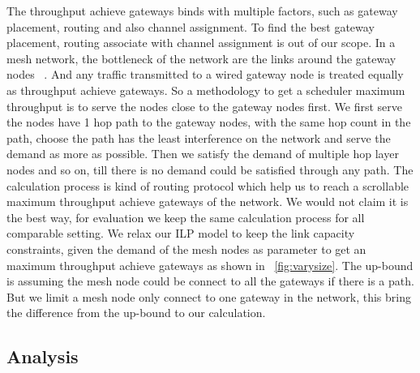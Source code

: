 The throughput achieve gateways binds with multiple factors, such as gateway placement, routing and also channel assignment.
To find the best gateway placement, routing associate with channel assignment is out of our scope. 
In a mesh network, the bottleneck of the network are the links around the gateway nodes ~\cite{robinson2010deploying}. 
And any traffic transmitted to a wired gateway node is treated equally as throughput achieve gateways. 
So a methodology to get a scheduler maximum throughput is to serve the nodes close to the gateway nodes first.
We first serve the nodes have 1 hop path to the gateway nodes, with the same hop count in the path, choose the path has the least interference on the network and serve the demand as more as possible. 
Then we satisfy the demand of multiple hop layer nodes and so on, till there is no demand could be satisfied through any path.
The calculation process is kind of routing protocol which help us to reach a scrollable maximum throughput achieve gateways of the network. 
We would not claim it is the best way, for evaluation we keep the same calculation process for all comparable setting.
We relax our ILP model to keep the link capacity constraints, given the demand of the mesh nodes as parameter to get an maximum throughput achieve gateways as shown in ~\ref{fig:varysize}. The up-bound is assuming the mesh node could be connect to all the gateways if there is a path. But we limit a mesh node only connect to one gateway in the network, this bring the difference from the up-bound to our calculation.



\subsection{Analysis}
\label{subsec:analysis}



